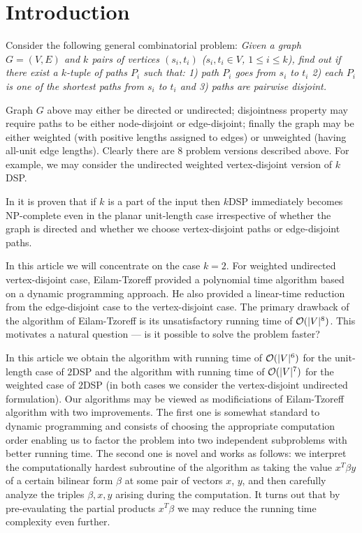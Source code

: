 \section{Introduction}

Consider the following general combinatorial problem: \emph{Given a graph $G = (V, E)$ and $k$ pairs of vertices $(s_i, t_i)$ ($s_i, t_i \in V$, $1 \leq i \leq k$), find out if there exist a $k$-tuple of paths $P_i$ such that: 1) path $P_i$ goes from $s_i$ to $t_i$ 2) each $P_i$ is one of the shortest paths from $s_i$ to $t_i$ and 3) paths are pairwise disjoint.}

Graph $G$ above may either be directed or undirected; disjointness property may require paths to be either node-disjoint or edge-disjoint; finally the graph may be either weighted (with positive lengths assigned to edges) or unweighted (having all-unit edge lengths). Clearly there are 8 problem versions described above. For example, we may consider the undirected weighted vertex-disjoint version of $k$DSP.

In \cite{ET} it is proven that if $k$ is a part of the input then $k$DSP immediately becomes NP-complete even in the planar unit-length case irrespective of whether the graph is directed and whether we choose vertex-disjoint paths or edge-disjoint paths. 

In this article we will concentrate on the case $k=2$. For weighted undirected vertex-disjoint case, Eilam-Tzoreff provided a polynomial time algorithm based on a dynamic programming approach. He also provided a linear-time reduction from the edge-disjoint case to the vertex-disjoint case. The primary drawback of the algorithm of Eilam-Tzoreff is its unsatisfactory running time of $\mathcal{O}(|V|^8)$. This motivates a natural question --- is it possible to solve the problem faster?

In this article we obtain the algorithm with running time of $\mathcal{O}(|V|^6)$ for the unit-length case of $2$DSP and the algorithm with running time of $\mathcal{O}(|V|^7)$ for the weighted case of $2$DSP (in both cases we consider the vertex-disjoint undirected formulation). Our algorithms may be viewed as modificiations of Eilam-Tzoreff algorithm with two improvements. The first one is somewhat standard to dynamic programming and consists of choosing the appropriate computation order enabling us to factor the problem into two independent subproblems with better running time. The second one is novel and works as follows: we interpret the computationally hardest subroutine of the algorithm as taking the value $x^T\beta y$ of a certain bilinear form $\beta$ at some pair of vectors $x$, $y$, and then carefully analyze the triples $\beta, x, y$ arising during the computation. It turns out that by pre-evaulating the partial products $x^T \beta$ we may reduce the running time complexity even further.

